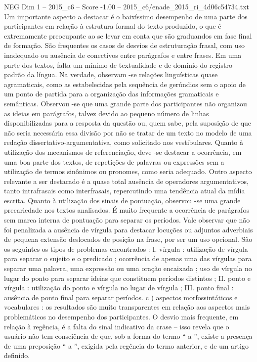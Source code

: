 \begin{textsample}{NEG Dim 1 – 2015\_c6 – Score -1.00 – 2015\_c6/enade\_2015\_ri\_4d06c54734.txt}
Um importante aspecto a destacar é o baixíssimo desempenho de uma parte dos participantes em relação à estrutura formal do texto produzido, o que é extremamente preocupante ao se levar em conta que são graduandos em fase final de formação.
São frequentes os casos de desvios de estruturação frasal, com uso inadequado ou ausência de conectivos entre parágrafos e entre frases.
Em uma parte dos textos, falta um mínimo de textualidade e de domínio do registro padrão da língua.
Na verdade, observam -se relações linguísticas quase agramaticais, como as estabelecidas pela sequência de gerúndios sem o apoio de um ponto de partida para a organização das informações gramaticais e semânticas.
Observou -se que uma grande parte dos participantes não organizou as ideias em parágrafos, talvez devido ao pequeno número de linhas disponibilizadas para a resposta da questão ou, quem sabe, pela suposição de que não seria necessária essa divisão por não se tratar de um texto no modelo de uma redação dissertativo-argumentativa, como solicitado nos vestibulares.
Quanto à utilização dos mecanismos de referenciação, deve -se destacar a ocorrência, em uma boa parte dos textos, de repetições de palavras ou expressões sem a utilização de termos sinônimos ou pronomes, como seria adequado.
Outro aspecto relevante a ser destacado é a quase total ausência de operadores argumentativos, tanto intrafrasais como interfrasais, repercutindo uma tendência atual da mídia escrita.
Quanto à utilização dos sinais de pontuação, observou -se uma grande precariedade nos textos analisados.
É muito frequente a ocorrência de parágrafos sem marca interna de pontuação para separar os períodos.
Vale observar que não foi penalizada a ausência de vírgula para destacar locuções ou adjuntos adverbiais de pequena extensão deslocados de posição na frase, por ser um uso opcional.
São os seguintes os tipos de problemas encontrados : I. vírgula : utilização de vírgula para separar o sujeito e o predicado ; ocorrência de apenas uma das vírgulas para separar uma palavra, uma expressão ou uma oração encaixada ; uso de vírgula no lugar do ponto para separar ideias que constituem períodos distintos ; II. ponto e vírgula : utilização do ponto e vírgula no lugar de vírgula ; III. ponto final : ausência de ponto final para separar períodos. c ) aspectos morfossintáticos e vocabulares : os resultados são muito transparentes em relação aos aspectos mais problemáticos no desempenho dos participantes.
O desvio mais frequente, em relação à regência, é a falta do sinal indicativo da crase – isso revela que o usuário não tem consciência de que, sob a forma do termo “ a ”, existe a presença de uma preposição “ a ”, exigida pela regência do termo anterior, e de um artigo definido.

\end{textsample}
